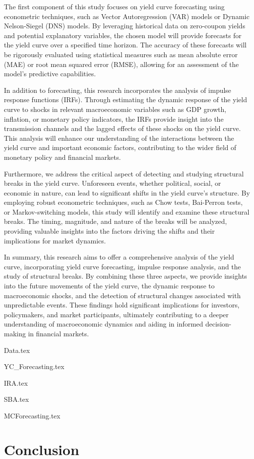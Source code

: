 \documentclass{vegaarticle}
\begin{document}
        The first component of this study focuses on yield curve forecasting using econometric techniques, such as
        Vector Autoregression (VAR) models or Dynamic Nelson-Siegel (DNS) models. By leveraging historical data on
        zero-coupon yields and potential explanatory variables, the chosen model will provide forecasts for the yield
        curve over a specified time horizon. The accuracy of these forecasts will be rigorously evaluated using
        statistical measures such as mean absolute error (MAE) or root mean squared error (RMSE), allowing for an
        assessment of the model's predictive capabilities.
        
        In addition to forecasting, this research incorporates the analysis of impulse response functions (IRFs).
        Through estimating the dynamic response of the yield curve to shocks in relevant macroeconomic variables such as
        GDP growth, inflation, or monetary policy indicators, the IRFs provide insight into the transmission channels
        and the lagged effects of these shocks on the yield curve. This analysis will enhance our understanding of the
        interactions between the yield curve and important economic factors, contributing to the wider field of monetary
        policy and financial markets.
        
        Furthermore, we address the critical aspect of detecting and studying structural breaks in the yield curve.
        Unforeseen events, whether political, social, or economic in nature, can lead to significant shifts in the yield
        curve's structure. By employing robust econometric techniques, such as Chow tests, Bai-Perron tests, or
        Markov-switching models, this study will identify and examine these structural breaks. The timing, magnitude,
        and nature of the breaks will be analyzed, providing valuable insights into the factors driving the shifts and
        their implications for market dynamics.
        
        In summary, this research aims to offer a comprehensive analysis of the yield curve, incorporating yield curve
        forecasting, impulse response analysis, and the study of structural breaks. By combining these three aspects,
        we provide insights into the future movements of the yield curve, the dynamic response to macroeconomic shocks,
        and the detection of structural changes associated with unpredictable events. These findings hold significant
        implications for investors, policymakers, and market participants, ultimately contributing to a deeper
        understanding of macroeconomic dynamics and aiding in informed decision-making in financial markets.

    
    {Data.tex}

    {YC_Forecasting.tex}

    {IRA.tex}

    {SBA.tex}

    {MCForecasting.tex}

    \section{Conclusion}

\end{document}

